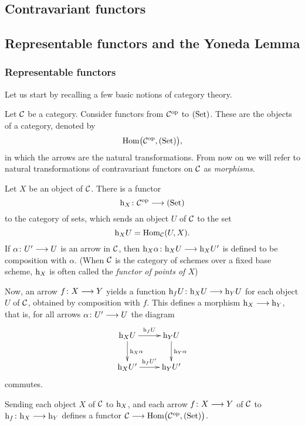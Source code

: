 \begin{2   CONTRAVARIANT FUNCTORS}
\setcounter{chapter}{1}
\chapter{Contravariant functors}\label{ch:functors}

\begin{2.1 Yoneda Lemma}
\setcounter{section}{0}
\section{Representable functors and the Yoneda Lemma}\label{sec:repfunctors}



\subsection{Representable functors}
Let us start by recalling a few basic notions of category theory.

Let $\mathcal{C}$ be a category. Consider functors from $\mathcal{C}^{\mathrm{op}}$ to $(\mathrm{Set})$. These are the objects of a category, denoted by
   \[
   \mathrm{Hom}\bigl(\mathcal{C}^{\mathrm{op}}, (\mathrm{Set})\bigr),
   \]
in which the arrows are the natural transformations. From now on we will refer to natural transformations of contravariant functors on $\mathcal{C}$ as \emph{morphisms}.

Let $X$ be an object of $\mathcal{C}$. There is a functor
   \[
   \h_X\colon \cC\op \arr\catset
   \]
to the category of sets, which sends an object $U$ of $\mathcal{C}$ to the set
   \[
   \mathrm{h}_X U = \operatorname{Hom}_{\mathcal{C}}(U, X).
   \] If $\alpha
\colon U' \arr U$ is an arrow in $\mathcal{C}$, then $\h_X \alpha  \colon \h_X U \arr \h_X U'$ is defined to be composition with $\alpha$. (When $\mathcal{C}$ is the category of schemes over a fixed base scheme, $\mathrm{h}_{X}$ is often called the \emph{functor of points of $X$})

Now, an arrow $f \colon X \arr Y$ yields a function $\h_f U \colon \h_X U \arr \h_Y U$ for each object $U$ of $\mathcal{C}$, obtained by composition with $f$. This defines a morphism $\h_X \arr \h_Y$, that is, for all arrows $\alpha\colon U' \arr U$ the diagram
   \[
   \xymatrix{
   {}\h_X U\ar[r]^{\h_f U} \ar[d]^{\h_X \alpha}
   & {}\h_Y U \ar[d]^{\h_Y \alpha}\\
   {}\h_X U'\ar[r]^{\h_f U'}&{}\h_Y U'\\
   }
   \]
commutes.



Sending each object $X$ of $\mathcal{C}$ to $\mathrm{h}_X$, and each arrow $f \colon X \arr Y$ of $\mathcal{C}$ to $\h_f \colon \h_X \arr \h_Y$ defines a functor $\cC \arr \func{\cC}$.


\end{2.1 Yoneda Lemma}
\end{2   CONTRAVARIANT FUNCTORS}
